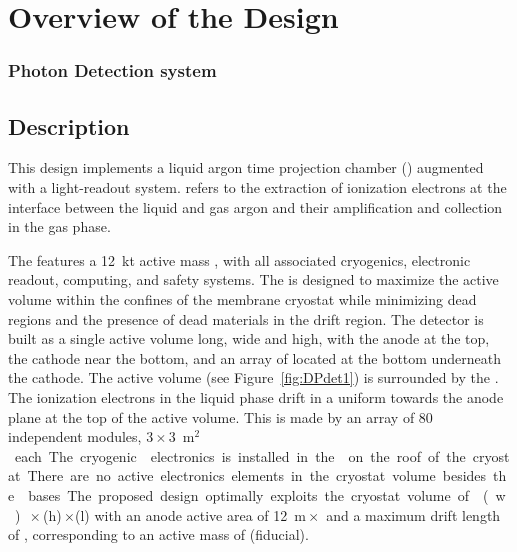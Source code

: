 \chapter{Overview of the \dpmod Design}
\label{ch:fddp-ov}

\subsection{Photon Detection system}
\label{v4:fddp-ov:pd}

\section{Description}
\label{sec:fddp-ov-description}

This \dual design implements a \dual liquid argon time projection chamber (\lartpc) augmented with a light-readout system.  \textit{\dual} refers to the extraction of ionization electrons at the interface between the liquid and gas argon and their amplification and collection in the gas phase.

The  features a \SI{12}{kt} active mass \lartpc, with all associated cryogenics, electronic readout, computing, and safety systems. The  is designed to maximize the active volume within the confines of the membrane cryostat while minimizing dead regions and the presence of dead materials in the drift region. The detector is built as a single active volume \dptpclen long, \dptpcwdth wide and \tpcheight high, with the anode at the top, the cathode near the bottom, and an array of  located  at the bottom %
underneath the cathode. The active volume (see Figure~\ref{fig:DPdet1}) is surrounded by the . The ionization electrons in the liquid phase drift  in a uniform \efield towards the anode plane at the top of the active volume. This is made by an array of \num{80} independent  modules, \num{3}\,$\times$\,\SI{3}{m$^2$} each. The cryogenic  electronics is %
installed in the 
on the roof of the cryostat. There are no active electronics elements in the cryostat volume besides the  bases.
The proposed design optimally exploits the cryostat volume of \cryostatwdth{}(w)\,$\times$\,\cryostatht{}(h)\,$\times$\cryostatlen{}(l) with an anode active area of  \SI{12}{m}\,$\times$\,\cryostatlen{} and a maximum drift length of \dpmaxdrift{}, corresponding to an active \lar mass of \dpactivelarmass  (\dpfidlarmass fiducial). 

